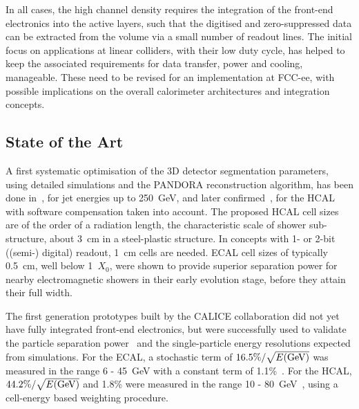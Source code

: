 In all cases, the high channel density requires the integration of the front-end electronics into the active layers, such that the digitised and zero-suppressed data can be extracted from the volume via a small number of readout lines.
The initial focus on applications at linear colliders, with their low duty cycle, has helped to keep the associated requirements for data transfer, power and cooling, manageable. 
These need to be revised for an implementation at FCC-ee, with possible implications on the overall calorimeter architectures and integration concepts. 



\subsection{State of the Art}
A first systematic optimisation of the 3D detector segmentation parameters, using detailed simulations and the PANDORA reconstruction algorithm, has been done in~\cite{Thomson:2009rp}, for jet energies up to 250~GeV, and later confirmed~\cite{Tran:2017tgr}, for the HCAL with software compensation taken into account.  The proposed HCAL cell sizes are of the order of a radiation length, the characteristic scale of shower sub-structure, about 3~cm in a steel-plastic structure. In concepts with 1- or 2-bit ((semi-) digital) readout, 1~cm cells are needed. 
ECAL cell sizes of typically 0.5~cm, well below 1~$X_0$, were shown to provide superior separation power for nearby electromagnetic showers in their early evolution stage, before they attain their full width. 

The first generation prototypes built by the CALICE collaboration did not yet have fully integrated front-end electronics, but were successfully used to validate the  particle separation power~\cite{Adloff:2011ha} and the single-particle energy resolutions expected from simulations. 
For the ECAL, 
a stochastic term of 
$16.5\%/\sqrt{E({\rm GeV})}$ was measured in the range 6 - 45~GeV with a constant term of 1.1\%~\cite{Anduze:2008hq}.
For the HCAL, $44.2\%/\sqrt{E({\rm GeV})}$ and 1.8\% were measured in the range 10 - 80~GeV~\cite{Adloff:2012gv}, using a cell-energy based weighting procedure.

